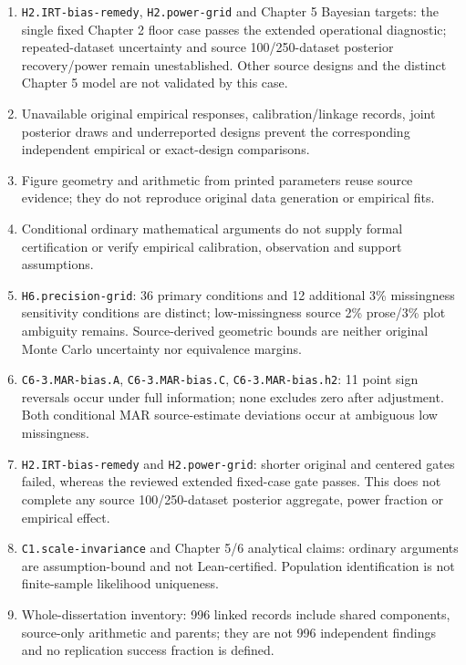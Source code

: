 \documentclass[11pt]{article}
\begin{document}
\begin{enumerate}
\item\label{lim:0} \nolinkurl{H2.IRT-bias-remedy}, \nolinkurl{H2.power-grid} and Chapter 5 Bayesian targets: the single fixed Chapter 2 floor case passes the extended operational diagnostic; repeated-dataset uncertainty and source 100/250-dataset posterior recovery/power remain unestablished. Other source designs and the distinct Chapter 5 model are not validated by this case.
\item\label{lim:1} Unavailable original empirical responses, calibration/linkage records, joint posterior draws and underreported designs prevent the corresponding independent empirical or exact-design comparisons.
\item\label{lim:2} Figure geometry and arithmetic from printed parameters reuse source evidence; they do not reproduce original data generation or empirical fits.
\item\label{lim:3} Conditional ordinary mathematical arguments do not supply formal certification or verify empirical calibration, observation and support assumptions.
\item\label{lim:4} \nolinkurl{H6.precision-grid}: 36 primary conditions and 12 additional 3\% missingness sensitivity conditions are distinct; low-missingness source 2\% prose/3\% plot ambiguity remains. Source-derived geometric bounds are neither original Monte Carlo uncertainty nor equivalence margins.
\item\label{lim:5} \nolinkurl{C6-3.MAR-bias.A}, \nolinkurl{C6-3.MAR-bias.C}, \nolinkurl{C6-3.MAR-bias.h2}: 11 point sign reversals occur under full information; none excludes zero after adjustment. Both conditional MAR source-estimate deviations occur at ambiguous low missingness.
\item\label{lim:6} \nolinkurl{H2.IRT-bias-remedy} and \nolinkurl{H2.power-grid}: shorter original and centered gates failed, whereas the reviewed extended fixed-case gate passes. This does not complete any source 100/250-dataset posterior aggregate, power fraction or empirical effect.
\item\label{lim:7} \nolinkurl{C1.scale-invariance} and Chapter 5/6 analytical claims: ordinary arguments are assumption-bound and not Lean-certified. Population identification is not finite-sample likelihood uniqueness.
\item\label{lim:8} Whole-dissertation inventory: 996 linked records include shared components, source-only arithmetic and parents; they are not 996 independent findings and no replication success fraction is defined.

\end{enumerate}
\end{document}
